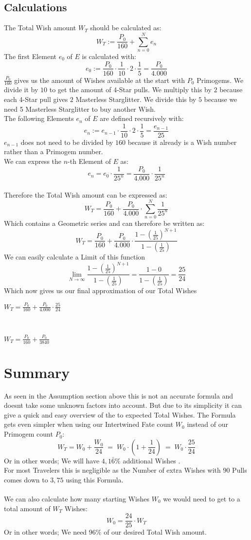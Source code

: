 \documentclass[11pt, a4paper]{article}
\begin{document}
\subsection{Calculations}
The Total Wish amount $W_T$ should be calculated as:
$$W_T:=\frac{P_0}{160}+\sum_{n=0}^{N}e_n$$
The first Element $e_0$ of $E$ is calculated with:
$$e_0:=\frac{P_0}{160}\cdot\frac{1}{10}\cdot2\cdot\frac{1}{5}=\frac{P_0}{4.000}$$
$\frac{P_0}{160}$ gives us the amount of Wishes available at the start with $P_0$ Primogems. We divide it by $10$ to get the amount of 4-Star pulls. We multiply this by $2$ because each 4-Star pull gives $2$ Masterless Starglitter. We divide this by $5$ because we need 5 Masterless Starglitter to buy another Wish.
\\
The following Elements $e_n$ of $E$ are defined recursively with:
$$e_n:=e_{n-1}\cdot\frac{1}{10}\cdot2\cdot\frac{1}{5}= \frac{e_{n-1}}{25}$$
$e_{n-1}$ does not need to be divided by $160$ because it already is a Wish number rather than a Primogem number.
\\
We can express the $n$-th Element of $E$ as:
$$e_n=e_0\cdot\frac{1}{25^n}= \frac{P_0}{4.000}\cdot\frac{1}{25^{n}}$$
\\
Therefore the Total Wish amount can be expressed as:
$$W_T=\frac{P_0}{160}+\frac{P_0}{4.000}\cdot\sum_{n=0}^{N}\frac{1}{25^n}$$
Which contains a Geometric series and can therefore be written as:
$$W_T =\frac{P_0}{160}+\frac{P_0}{4.000}\cdot\frac{1-(\frac{1}{25})^{N+1}}{1-(\frac{1}{25})}$$
We can easily calculate a Limit of this function
$$\lim_{N\to\infty}\frac{1-(\frac{1}{25})^{N+1}}{1-(\frac{1}{25})}=\frac{1-0}{1-(\frac{1}{25})} = \frac{25}{24}$$
Which now gives us our final approximation of our Total Wishes
\begin{center}
$W_T=\frac{P_0}{160}+\frac{P_0}{4.000}\cdot\frac{25}{24}$
\end{center}
\\
\begin{center}
$W_T=\frac{P_0}{160}+\frac{P_0}{3840}$
\end{center}
\newpage

\section{Summary}
As seen in the Assumption section above this is not an accurate formula and doesnt take some unknown factors into account. But due to its simplicity it can give a quick and easy overview of the to expected Total Wishes.
The Formula gets even simpler when using our Intertwined Fate count $W_0$ instead of our Primogem count $P_0$:
$$W_T = W_0 + \frac{W_0}{24} \;=\; W_0\cdot(1+\frac{1}{24})\;=\;W_0\cdot\frac{25}{24}$$
Or in other words; We will have $4,\!1\bar{6}$\% additional Wishes .  
\\
For most Travelers this is negligible as the Number of extra Wishes with $90$ Pulls comes down to $3,\!75$ using this Formula.
\\
\\
We can also calculate how many starting Wishes $W_0$ we would need to get to a total amount of $W_T$ Wishes:
$$W_0=\frac{24}{25}\cdot W_T$$
Or in other words; We need $96$\% of our desired Total Wish amount. 
\newpage
\end{document}
